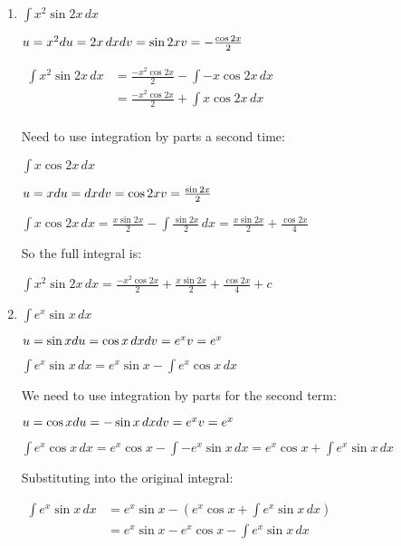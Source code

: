 \documentclass[../main.tex]{subfiles}
\begin{document}
\begin{enumerate}
    \item \(\int x^2 \sin{2x} \, dx\)
    
    \(u=x^2\\
    du=2x\,dx\\
    dv=\sin{2x}\\
    v=-\frac{\cos{2x}}{2}\)

    $
    \!
    \begin{aligned}
        \int x^2 \sin{2x} \, dx
        &=\frac{-x^2\cos{2x}}{2}-\int -x\cos{2x}\, dx\\
        &=\frac{-x^2\cos{2x}}{2}+\int x\cos{2x}\, dx\\
    \end{aligned}
    $
    
    Need to use integration by parts a second time:

    \(\int x\cos{2x}\, dx\)

    \(u=x\\
    du=dx\\
    dv=\cos{2x}\\
    v=\frac{\sin{2x}}{2}\)

    \(\int x\cos{2x}\, dx=\frac{x\sin{2x}}{2}-\int \frac{\sin{2x}}{2}\,dx=\frac{x\sin{2x}}{2}+\frac{\cos{2x}}{4}\)

    So the full integral is:

    \(\int x^2 \sin{2x} \, dx=\frac{-x^2\cos{2x}}{2}+\frac{x\sin{2x}}{2}+\frac{\cos{2x}}{4}+c\)
    
    \item \(\int e^x \sin{x}\, dx\)
    
    \(u=\sin{x}\\
    du=\cos{x}\,dx\\
    dv=e^x\\
    v=e^x\)

    \(\int e^x \sin{x}\, dx=e^x\sin{x}-\int e^x\cos{x}\,dx\)

    We need to use integration by parts for the second term:

    \(u=\cos{x}\\
    du=-\sin{x}\,dx\\
    dv=e^x\\
    v=e^x\)

    \(\int e^x\cos{x}\,dx=e^x\cos{x}-\int -e^x\sin{x}\,dx=e^x\cos{x}+\int e^x\sin{x}\, dx\)

    Substituting into the original integral:

    $
    \!
    \begin{aligned}
        \int e^x \sin{x}\, dx
        &=e^x\sin{x}-(e^x\cos{x}+\int e^x\sin{x}\, dx)\\
        &=e^x\sin{x}-e^x\cos{x}-\int e^x\sin{x}\, dx\\
    \end{aligned}
    $


\end{enumerate}
\end{document}

